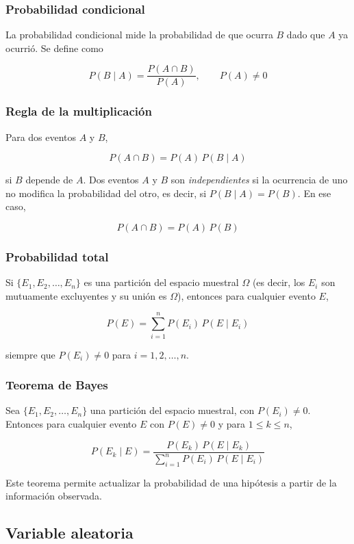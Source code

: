\documentclass[10pt,letterpaper]{article}
\begin{document}
\subsubsection{Probabilidad condicional}

La probabilidad condicional mide la probabilidad de que ocurra $B$ dado que $A$ ya ocurrió. Se define como

\[P(B\mid A) = \frac{P(A \cap B)}{P(A)}, \qquad P(A) \neq 0\]

\subsubsection{Regla de la multiplicación}

Para dos eventos $A$ y $B$,

\[P(A \cap B) = P(A)\,P(B\mid A)\]

si $B$ depende de $A$. Dos eventos $A$ y $B$ son \textit{independientes} si la ocurrencia de uno no modifica la probabilidad del otro, es decir, si $P(B\mid A)=P(B)$. En ese caso,

\[P(A \cap B) = P(A)\,P(B)\]

\subsubsection{Probabilidad total}

Si $\{E_1, E_2, \ldots, E_n\}$ es una partición del espacio muestral $\Omega$ (es decir, los $E_i$ son mutuamente excluyentes y su unión es $\Omega$), entonces para cualquier evento $E$,

\[P(E) = \sum_{i=1}^{n} P(E_i)\,P(E\mid E_i)\]

siempre que $P(E_i) \neq 0$ para $i=1,2,\ldots,n$.

\subsubsection{Teorema de Bayes}

Sea $\{E_1, E_2, \ldots, E_n\}$ una partición del espacio muestral, con $P(E_i) \neq 0$. Entonces para cualquier evento $E$ con $P(E) \neq 0$ y para $1 \leq k \leq n$,

\[P(E_k\mid E) = \frac{P(E_k)\,P(E\mid E_k)}{\sum_{i=1}^{n} P(E_i)\,P(E\mid E_i)}\]

Este teorema permite actualizar la probabilidad de una hipótesis a partir de la información observada.

\subsection{Variable aleatoria}
\end{document}
